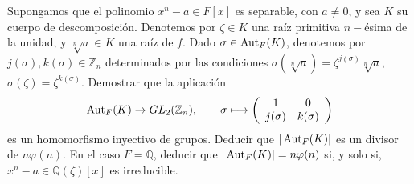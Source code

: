\begin{ejercicio}
    Supongamos que el polinomio $x^n-a\in F[x]$ es separable, con $a\neq 0$, y sea $K$ su cuerpo de descomposición. Denotemos por $\zeta\in K$ una raíz primitiva $n-$ésima de la unidad, y $\sqrt[n]{a}\in K$ una raíz de $f$. Dado $\sigma\in \operatorname{Aut}_F(K)$, denotemos por $j(\sigma),k(\sigma)\in \mathbb{Z}_n$ determinados por las condiciones $\sigma(\sqrt[n]{a}) = \zeta^{j(\sigma)}\sqrt[n]{a}$, $\sigma(\zeta) = \zeta^{k(\sigma)}$. Demostrar que la aplicación 
    \begin{equation*}
        \operatorname{Aut}_F(K) \to GL_2(\mathbb{Z}_n), \qquad \sigma\longmapsto \left(\begin{array}{cc}
            1 & 0 \\
            j(\sigma) &k(\sigma)  
        \end{array}\right)
    \end{equation*}
    es un homomorfismo inyectivo de grupos. Deducir que $|\operatorname{Aut}_F(K)|$ es un divisor de $n\varphi(n)$. En el caso $F=\mathbb{Q}$, deducir que $|\operatorname{Aut}_F(K)| = n\varphi(n)$ si, y solo si, $x^n-a\in \mathbb{Q}(\zeta)[x]$ es irreducible.
\end{ejercicio}

